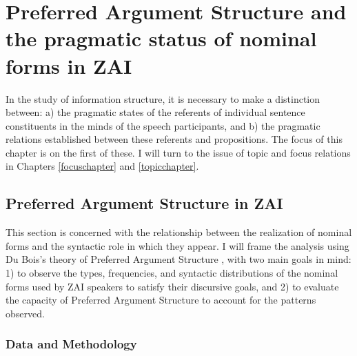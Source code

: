 \chapter{Preferred Argument Structure and the pragmatic status of nominal forms in ZAI}\label{paschapter}

In the study of information structure, it is necessary to make a distinction between: a) the pragmatic states of the referents of individual sentence constituents in the minds of the speech participants, and b) the pragmatic relations established between these referents and propositions. The focus of this chapter is on the first of these. I will turn to the issue of topic and focus relations in Chapters \ref{focuschapter} and \ref{topicchapter}.



\section{Preferred Argument Structure in ZAI}\label{pasinzai}

This section is concerned with the relationship between the realization of nominal forms and the syntactic role in which they appear. I will frame the analysis using Du Bois's theory of Preferred Argument Structure \citep{dubois1987,dubois2003,dubois2003a,dubois2003b}, with two main goals in mind: 1) to observe the types, frequencies, and syntactic distributions of the nominal forms used by ZAI speakers to satisfy their discursive goals, and 2) to evaluate the capacity of Preferred Argument Structure to account for the patterns observed.


\subsection{Data and Methodology}\label{data}

